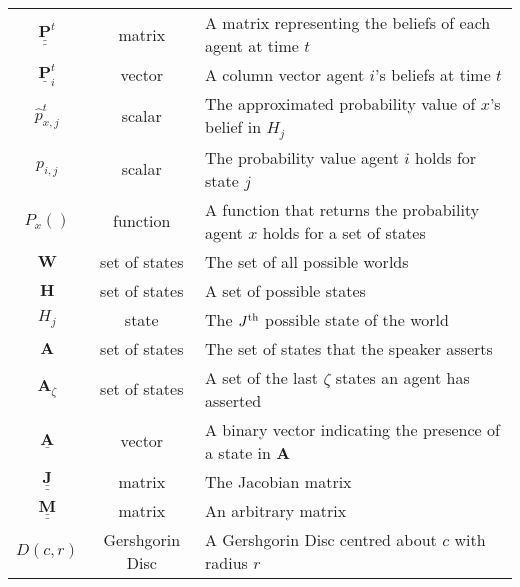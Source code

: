 \begin{table}[H]
\begin{tabular}{c|c|l}
$\underline{\underline{\mathbf{P}}}^t$ & matrix & A matrix representing the beliefs of each agent at time $t$ \\
$\underline{\mathbf{P}}^t_i$ & vector & A column vector agent $i$'s beliefs at time $t$\\
$\hat{p}^t_{x,j}$ & scalar & The approximated probability value of $x$'s belief in $H_j$ \\
$p_{i,j}$ & scalar & The probability value agent $i$ holds for state $j$\\
$P_x()$ & function & A function that returns the probability agent $x$ holds for a set of states\\ \hline

$\mathbf{W}$ & set of states & The set of all possible worlds \\
$\mathbf{H}$ & set of states & A set of possible states \\
$H_j$ & state & The $J^\textnormal{th}$ possible state of the world \\
$\mathbf{A}$ & set of states & The set of states that the speaker asserts \\
$\mathbf{A}_\zeta$ & set of states & A set of the last $\zeta$ states an agent has asserted \\
$\underline{\mathbf{A}}$ & vector & A binary vector indicating the presence of a state in $\mathbf{A}$ \\ \hline 


$\underline{\underline{\mathbf{J}}}$ & matrix & The Jacobian matrix \\
$\underline{\underline{\mathbf{M}}}$ & matrix & An arbitrary matrix\\ \hline

$D(c, r)$ & Gershgorin Disc & A Gershgorin Disc centred about $c$ with radius $r$ \\ \hline



\end{tabular}
\end{table}
